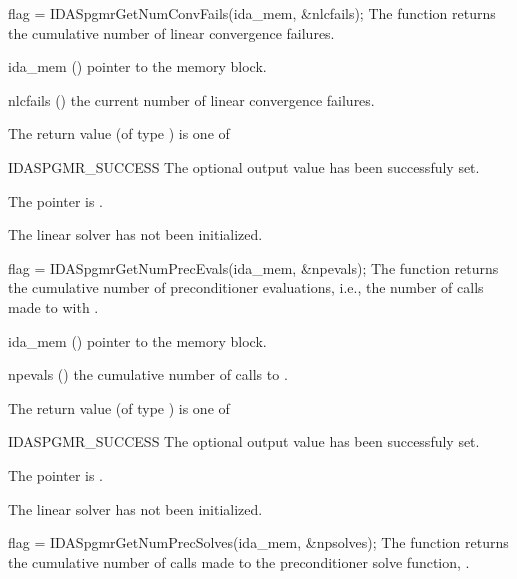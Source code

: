 {}
{
  flag = IDASpgmrGetNumConvFails(ida\_mem, \&nlcfails);
}
{
  The function  returns the
  cumulative number of linear convergence failures.
}
{
  \begin{args}[nlcfails]
  \item[ida\_mem] ()
    pointer to the {\ida} memory block.
  \item[nlcfails] ()
    the current number of linear convergence failures.
  \end{args}
}
{
  The return value  (of type ) is one of
  \begin{args}
  \item[IDASPGMR\_SUCCESS] 
    The optional output value has been successfuly set.
  \item[\Id{IDASPGMR\_MEM\_NULL}]
    The  pointer is .
  \item[\Id{IDASPGMR\_LMEM\_NULL}]
    The {\idaspgmr} linear solver has not been initialized.
  \end{args}
}
{}
{
  flag = IDASpgmrGetNumPrecEvals(ida\_mem, \&npevals);
}
{
  The function  returns the
  cumulative number of preconditioner evaluations, i.e., the number of 
  calls made to  with .
}
{
  \begin{args}[npevals]
  \item[ida\_mem] ()
    pointer to the {\ida} memory block.
  \item[npevals] ()
    the cumulative number of calls to .
  \end{args}
}
{
  The return value  (of type ) is one of
  \begin{args}
  \item[IDASPGMR\_SUCCESS] 
    The optional output value has been successfuly set.
  \item[\Id{IDASPGMR\_MEM\_NULL}]
    The  pointer is .
  \item[\Id{IDASPGMR\_LMEM\_NULL}]
    The {\idaspgmr} linear solver has not been initialized.
  \end{args}
}
{}
{
  flag = IDASpgmrGetNumPrecSolves(ida\_mem, \&npsolves);
}
{
  The function  returns the
  cumulative number of calls made to the preconditioner 
  solve function, .
}

